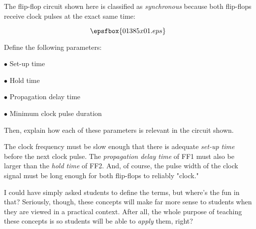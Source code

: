 

The flip-flop circuit shown here is classified as {\it synchronous} because both flip-flops receive clock pulses at the exact same time:

$$\epsfbox{01385x01.eps}$$

Define the following parameters:

\medskip
\item{$\bullet$} Set-up time
\item{$\bullet$} Hold time
\item{$\bullet$} Propagation delay time
\item{$\bullet$} Minimum clock pulse duration
\medskip

Then, explain how each of these parameters is relevant in the circuit shown.







The clock frequency must be slow enough that there is adequate {\it set-up time} before the next clock pulse.  The {\it propagation delay time} of FF1 must also be larger than the {\it hold time} of FF2.  And, of course, the pulse width of the clock signal must be long enough for both flip-flops to reliably "clock."







I could have simply asked students to define the terms, but where's the fun in that?  Seriously, though, these concepts will make far more sense to students when they are viewed in a practical context.  After all, the whole purpose of teaching these concepts is so students will be able to {\it apply} them, right?




